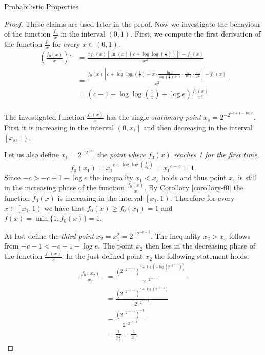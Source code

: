 \begin{section}{Probabilistic Properties}
\begin{proof}
These claims are used later in the proof. Now we investigate the behaviour of the function $\frac{f_0}{x}$ in the interval $(0, 1)$. First, we compute the first derivation of the function $\frac{f_0}{x}$ for every $x \in (0, 1)$.
\[
\begin{split}
\left(\frac{f_0(x)}{x}\right)' 
	& = \frac{xf_0(x)\left[\ln(x)\left(c + \log \log \left(\frac{1}{x}\right)\right)\right]' - f_0(x)}{x^2} \\
	& = \frac{f_0(x)\left[c + \log \log \left(\frac{1}{x}\right) + x \cdot \frac{\ln x}{\log\left(\frac{1}{x}\right) \ln 2}\cdot\frac{x}{\ln 2}\cdot\frac{-1}{x ^ 2} \right] - f_0(x)}{x^2} \\
	& = \left(c - 1 + \log \log \left( \frac{1}{x} \right) + \log e \right)\frac{f_0(x)}{x^2} \\
\end{split}
\]

The investigated function $\frac{f_0(x)}{x}$ has the single \emph{stationary point} $x_s = 2 ^ {-2 ^ {-c + 1 - \log e}}$. First it is increasing in the interval $\left(0, x_s \right]$ and then decreasing in the interval $\left[x_s, 1\right)$. 

Let us also define $x_1 = 2 ^ {-2 ^ {-c}}$, the \emph{point where $f_0(x)$ reaches 1 for the first time},
\[
f_0(x_1) = {x_1} ^ {c + \log \log \left(\frac{1}{x_1}\right)} = {x_1} ^ {c - c} = 1 \text{.}
\]
Since $-c > -c + 1 -\log e$ the inequality $x_1 < x_s$ holds and thus point $x_1$ is still in the increasing phase of the function $\frac{f_0(x)}{x}$.
By Corollary \ref{corollary-f0} the function $f_0(x)$ is increasing in the interval $\left[x_1, 1\right)$. Therefore for every $x \in \left[x_1, 1\right)$ we have that $f_0(x) \geq f_0(x_1) = 1$ and $f(x) = \min \{1, f_0(x)\} = 1$.

At last define the \emph{third point} $x_2 = x_1 ^ 2 = 2 ^ {-2 ^ {-c - 1}}$. The inequality $x_2 > x_s$ follows from $-c - 1 < -c + 1 - \log e$. The point $x_2$ then lies in the decreasing phase of the function $\frac{f_0(x)}{x}$. In the just defined point $x_2$ the following statement holds.
\[
\begin{split}
\frac{f_0(x_2)}{x_2} 
	& = \frac{\left(2 ^ {-2 ^ {-c - 1}}\right) ^ {c + \log \left(- \log \left(2 ^ {-2 ^ {-c - 1}}\right)\right)}}{2 ^ {-2 ^ {-c - 1}}} \\
	& = \frac{\left(2 ^ {-2 ^ {-c - 1}}\right) ^ {c + \log \left(2 ^ {-c - 1}\right)}}{2 ^ {-2 ^ {-c - 1}}} \\
	& = \frac{\left(2 ^ {-2 ^ {-c - 1}}\right) ^ {-1}}{2 ^ {-2 ^ {-c - 1}}} \\
	& = \frac{1}{x_2^2} = \frac{1}{x_1}
\end{split}
\]


\end{proof}
\end{section}
